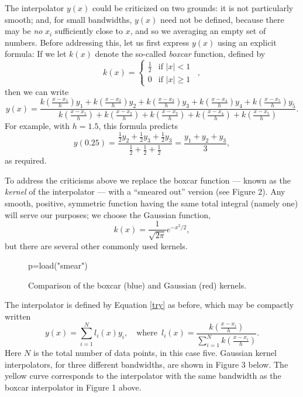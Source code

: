 \documentclass[11pt, reqno]{amsart}
\newcommand\df{\em}
\begin{document}
The interpolator $y(x)$ could be criticized on two grounds: it is not
particularly smooth; and, for small bandwidths, $y(x)$ need not be
defined, because there may be {\em no} $x_i$ sufficiently close to
$x$, and so we averaging an empty set of numbers. Before addressing
this, let us first express $y(x)$ using an explicit formula: If we let
$k(x)$ denote the so-called {\df boxcar} function, defined by
\begin{equation*}
  k(x) = \begin{cases}
          \frac{1}{2} & \text{if $|x|<1$}\\
          0 &\text{if $|x|\ge 1$}
        \end{cases}\enspace,
\end{equation*}
then we can write
\begin{equation}
  y(x)=\frac{ k(\frac{x-x_1}{h})y_1 + k(\frac{x-x_2}{h})y_2 + k(\frac{x-x_3}{h})y_3 + k(\frac{x-x_4}{h})y_4 + k(\frac{x-x_5}{h})y_5}{ k(\frac{x-x_1}{h}) + k(\frac{x-x_2}{h}) + k(\frac{x-x_3}{h}) + k(\frac{x-x_4}{h}) + k(\frac{x-x_5}{h})}.\label{try}
\end{equation}
For example, with $h=1.5$, this formula predicts
\begin{equation*}
  y(0.25)=\frac{\frac{1}{2}y_2 + \frac{1}{2}y_3 +
    \frac{1}{2}y_3}{\frac{1}{2} + \frac{1}{2} + \frac{1}{2}} =
  \frac{y_1 + y_2 + y_3}{3},
\end{equation*}
as required. 

To address the criticisms above we replace the boxcar function ---
known as the {\df kernel} of the interpolator --- with a ``smeared
out'' version (see Figure 2). Any smooth, positive, symmetric function
having the same total integral (namely one) will serve our purposes;
we choose the Gaussian function,
\begin{equation}
  k(x)= \frac{1}{\sqrt{2\pi}}e^{-x^2/2},\label{gg}
\end{equation}
but there are several other commonly used kernels.
%
\begin{figure}
  \begin{sagesilent}
     p=load("smear")
  \end{sagesilent}
  \centering 
  \caption{{} Comparison of the boxcar (blue) and Gaussian (red) kernels.}
\end{figure}
%
The interpolator is defined by Equation \eqref{try} as before, which may be compactly written
\begin{equation*}
    y(x)=\sum_{i=1}^N l_i(x)y_i,\quad 
\text{where}\enspace l_i(x)=\frac{k(\frac{x-x_i}{h})}{\sum_{i=1}^N k(\frac{x-x_i}{h})}.
\end{equation*}
Here $N$ is the total number of data points, in this case five. Gaussian
kernel interpolators, for three different bandwidths, are shown in
Figure 3 below. The yellow curve corresponds to the interpolator with
the same bandwidth as the boxcar interpolator in Figure 1 above.
\end{document}
